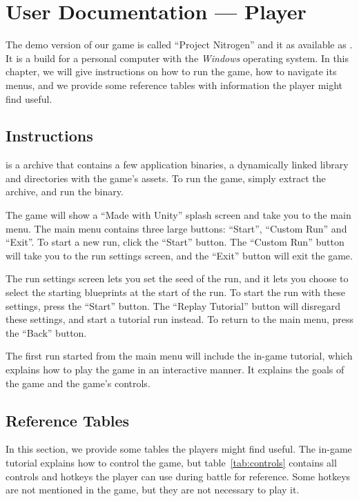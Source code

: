 \chapter{User Documentation --- Player}

The demo version of our game is called \enquote{Project Nitrogen} and it as available as .
It is a build for a personal computer with the \emph{Windows} operating system.
In this chapter, we will give instructions on how to run the game, how to navigate its menus, and we provide some reference tables with information the player might find useful.

\section{Instructions}

 is a  archive that contains a few application binaries, a dynamically linked library and directories with the game's assets.
To run the game, simply extract the archive, and run the  binary.

The game will show a \enquote{Made with Unity} splash screen and take you to the main menu.
The main menu contains three large buttons: \enquote{Start}, \enquote{Custom Run} and  \enquote{Exit}.
To start a new run, click the \enquote{Start} button.
The \enquote{Custom Run} button will take you to the run settings screen, and the \enquote{Exit} button will exit the game.

The run settings screen lets you set the seed of the run, and it lets you choose to select the starting blueprints at the start of the run.
To start the run with these settings, press the \enquote{Start} button.
The \enquote{Replay Tutorial} button will disregard these settings, and start a tutorial run instead.
To return to the main menu, press the \enquote{Back} button.

The first run started from the main menu will include the in-game tutorial, which explains how to play the game in an interactive manner.
It explains the goals of the game and the game's controls.

\section{Reference Tables}

In this section, we provide some tables the players might find useful.
The in-game tutorial explains how to control the game, but table~\ref{tab:controls} contains all controls and hotkeys the player can use during battle for reference.
Some hotkeys are not mentioned in the game, but they are not necessary to play it.

